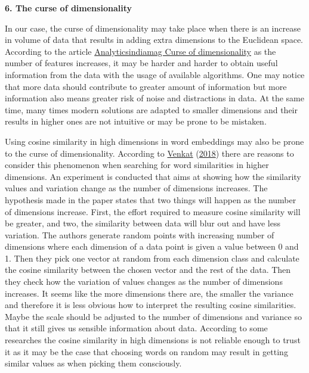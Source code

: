 \documentclass[
  12pt,
]{book}
\begin{document}
\textbf{6. The curse of dimensionality}

In our case, the curse of dimensionality may take place when there is an increase in volume of data that results in adding extra dimensions to the Euclidean space. According to the article
\href{https://analyticsindiamag.com/curse-of-dimensionality-and-what-beginners-should-do-to-overcome-it/}{Analyticsindiamag Curse of dimensionality} as the number of features increases, it may be harder and harder to obtain useful information from the data with the usage of available algorithms. One may notice that more data should contribute to greater amount of information but more information also means greater risk of noise and distractions in data. At the same time, many times modern solutions are adapted to smaller dimensions and their results in higher ones are not intuitive or may be prone to be mistaken.

Using cosine similarity in high dimensions in word embeddings may also be prone to the curse of dimensionality. According to \protect\hyperlink{ref-Venkat2018Curse}{Venkat} (\protect\hyperlink{ref-Venkat2018Curse}{2018}) there are reasons to consider this phenomenon when searching for word similarities in higher dimensions. An experiment is conducted that aims at showing how the similarity values and variation change as the number of dimensions increases. The hypothesis made in the paper states that two things will happen as the number of dimensions increase. First, the effort required to measure cosine similarity will be greater, and two, the similarity between data will blur out and have less variation. The authors generate random points with increasing number of dimensions where each dimension of a data point is given a value between 0 and 1. Then they pick one vector at random from each dimension class and calculate the cosine similarity between the chosen vector and the rest of the data. Then they check how the variation of values changes as the number of dimensions increases. It seems like the more dimensions there are, the smaller the variance and therefore it is less obvious how to interpret the resulting cosine similarities. Maybe the scale should be adjusted to the number of dimensions and variance so that it still gives us sensible information about data. According to some researches the cosine similarity in high dimensions is not reliable enough to trust it as it may be the case that choosing words on random may result in getting similar values as when picking them consciously.
\end{document}
